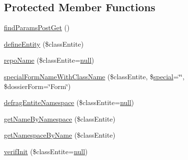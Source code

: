 \subsection*{Protected Member Functions}
\begin{DoxyCompactItemize}
\item 
\hyperlink{classentities_generic_ab7f087b00321eb5198024c1b295864b5}{find\+Params\+Post\+Get} ()
\item 
\hyperlink{classentities_generic_ac1d739167a3a6173103751aa673e87a1}{define\+Entity} (\$class\+Entite)
\item 
\hyperlink{classentities_generic_a6730b78a53ddefffe4cb7c4d1563333e}{repo\+Name} (\$class\+Entite=\hyperlink{validate_8js_afb8e110345c45e74478894341ab6b28e}{null})
\item 
\hyperlink{classentities_generic_a7eafc9967c64d48dd8d00143f53070dc}{special\+Form\+Name\+With\+Class\+Name} (\$class\+Entite, \$\hyperlink{jquery_8mobile-1_83_81_8js_a8891fd2268d56dd915745aab71faaf7f}{special}=\char`\"{}\char`\"{}, \$dossier\+Form=\char`\"{}Form\char`\"{})
\item 
\hyperlink{classentities_generic_adfdc8fc57d07a830c73ec1a70b6e8ef2}{defrag\+Entite\+Namespace} (\$class\+Entite=\hyperlink{validate_8js_afb8e110345c45e74478894341ab6b28e}{null})
\item 
\hyperlink{classentities_generic_ace36c3bb3cab00b68ad477d7b1e6bb38}{get\+Name\+By\+Namespace} (\$class\+Entite)
\item 
\hyperlink{classentities_generic_aa46fe9fb069331542ebeea1aff82971f}{get\+Namespace\+By\+Name} (\$class\+Entite)
\item 
\hyperlink{classentities_generic_a1b71b5283aa21c027303d9cdcb33285d}{verif\+Init} (\$class\+Entite=\hyperlink{validate_8js_afb8e110345c45e74478894341ab6b28e}{null})
\end{DoxyCompactItemize}

